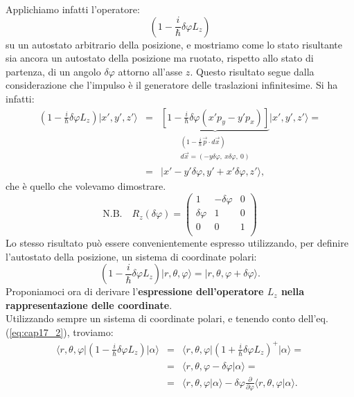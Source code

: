 \documentclass[a4paper,12pt,oneside]{book}
\begin{document}
Applichiamo infatti l'operatore:
\begin{equation}
\left(1- \frac{i}{\hbar}\delta \varphi L_z\right)
\end{equation}
su un autostato arbitrario della posizione, e mostriamo come lo stato risultante sia ancora un autostato della posizione ma ruotato, rispetto allo stato di partenza, di un angolo $\delta \varphi$ attorno all'asse $z$. Questo risultato segue dalla considerazione che l'impulso è il generatore delle traslazioni infinitesime. Si ha infatti:
\begin{eqnarray}
\left(1- \frac{i}{\hbar}\delta \varphi L_z\right)\vert x', y', z'\rangle &=& \underbrace{\left[1- \frac{i}{\hbar}\delta \varphi\left(x'p_y-y'p_x\right)\right]}_{\begin{array}{cc}
\scriptstyle{(1- \frac{i}{\hbar}\vec{p}\cdot d\vec{x})}\\
\scriptstyle{d\vec{x}= (-y\delta \varphi ,\ x \delta \varphi ,\ 0)}
\end{array}}\vert x', y', z'\rangle = \nonumber \\
&=&\vert x'-y'\delta \varphi , y'+x'\delta \varphi , z'\rangle ,
\end{eqnarray}
che è quello che volevamo dimostrare.
\begin{equation}
\textrm{N.B.} \quad 
R_z (\delta \varphi)=
\begin{pmatrix}
1 & -\delta \varphi & 0\\
\delta \varphi & 1 & 0 \\
0 & 0 & 1 \\
\end{pmatrix}
\end{equation}
Lo stesso risultato può essere convenientemente espresso utilizzando, per definire l'autostato della posizione, un sistema di coordinate polari:
\begin{equation}
\left(1- \frac{i}{\hbar}\delta \varphi L_z\right)\vert r, \theta, \varphi\rangle = \vert r, \theta, \varphi + \delta\varphi\rangle .
\label{eq:cap17_2}
\end{equation}
Proponiamoci ora di derivare l'\textbf{espressione dell'operatore $L_z$ nella rappresentazione delle coordinate}.\\
Utilizzando sempre un sistema di coordinate polari, e tenendo conto dell'eq. (\ref{eq:cap17_2}), troviamo:
\begin{eqnarray}
\langle r, \theta, \varphi \vert \left(1- \frac{i}{\hbar}\delta \varphi L_z\right) \vert \alpha\rangle &=& \langle r, \theta, \varphi \vert \left(1+ \frac{i}{\hbar}\delta \varphi L_z\right) ^+ \vert \alpha\rangle =\nonumber \\
&=& \langle r, \theta, \varphi - \delta \varphi \vert\alpha\rangle  = \nonumber \\
&=& \langle r, \theta, \varphi \vert \alpha\rangle - \delta \varphi \frac{\partial}{\partial \varphi}\langle r, \theta, \varphi \vert\alpha\rangle .
\end{eqnarray}
\end{document}
